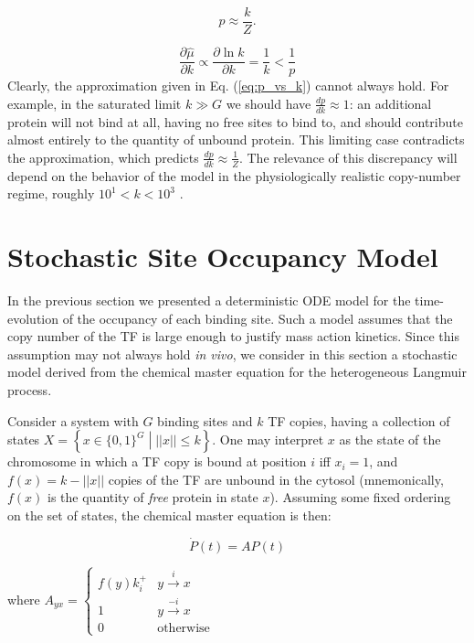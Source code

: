 \documentclass{article}
\begin{document}
\begin{equation}
  \label{eq:p_vs_k}
  p \approx \frac{k}{Z}.
\end{equation}

\begin{equation}
  \frac{\partial\hat\mu}{\partial k}\propto \frac{\partial\ln k}{\partial k} = \frac{1}{k} < \frac{1}{p}
\end{equation}
Clearly, the approximation given in Eq. (\ref{eq:p_vs_k}) cannot
always hold.  For example, in the saturated limit $k\gg G$ we should
have $\frac{dp}{dk}\approx 1$: an additional protein will not bind at
all, having no free sites to bind to, and should contribute almost
entirely to the quantity of unbound protein. This limiting case
contradicts the approximation, which predicts $\frac{dp}{dk}\approx
\frac{1}{Z}$.  The relevance of this discrepancy will depend on the
behavior of the model in the physiologically realistic copy-number
regime, roughly $10^1 < k < 10^3$ \cite{ishihama08}.  

\section{Stochastic Site Occupancy Model}
In the previous section we presented a deterministic ODE model for the
time-evolution of the occupancy of each binding site.  Such a model
assumes that the copy number of the TF is large enough to justify mass
action kinetics.  Since this assumption may not always hold \textit{in
  vivo}, we consider in this section a stochastic model derived from
the chemical master equation for the heterogeneous Langmuir process.

Consider a system with $G$ binding sites and $k$ TF copies, having a
collection of states $X = \left\{x \in \{0,1\}^G \middle| ||x|| \leq
  k\right\}$.  One may interpret $x$ as the state of the chromosome in
which a TF copy is bound at position $i$ iff $x_i = 1$, and $f(x) = k
- ||x||$ copies of the TF are unbound in the cytosol (mnemonically,
$f(x)$ is the quantity of \textit{free} protein in state $x$).
Assuming some fixed ordering on the set of states, the chemical master
equation is then:

\begin{equation}
  \label{eq:cme}
  \dot P(t) = A P(t)
\end{equation}

where $A_{yx} =
\begin{cases}
  f(y) k_i^+ & y \overset{i}{\rightarrow} x\\
  1 & y \overset{-i}{\rightarrow} x \\
  0 & \textrm{otherwise}
\end{cases}
$
\end{document}
